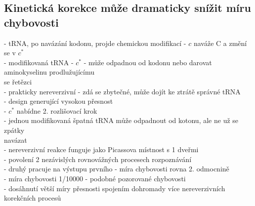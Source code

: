 \documentclass[11pt,a4paper]{report}
\begin{document}
\subsection{Kinetická korekce může dramaticky snížit míru chybovosti}
- tRNA, po navázání kodonu, projde chemickou modifikací - $c$ naváže C a změní se v $c^*$\\
\indent - modifikovaná tRNA - $c^*$ - může odpadnou od kodonu nebo darovat aminokyselinu prodlužujícímu\\
\indent \indent se řetězci\\
\indent - prakticky nereverzivní - zdá se zbytečné, může dojít ke ztrátě správné tRNA\\
\indent - design generující vysokou přesnost\\
\indent - $c^*$ nabídne 2. rozlišovací krok\\
\indent \indent - jednou modifikovaná špatná tRNA může odpadnout od kotonu, ale ne už se zpátky\\
\indent \indent \indent navázat\\
\indent \indent \indent - nereverzivní reakce funguje jako Picassova místnost s 1 dveřmi\\
\indent - povolení 2 nezávislých rovnovážných procesech rozpoznávání\\
\indent \indent - druhý pracuje na výstupu prvního - míra chybovosti rovna 2. odmocnině\\
- míra chybovosti 1/10000 - podobné pozorované chybovosti\\
- dosáhnutí větší míry přesnosti spojením dohromady více nereverzivních korekčních procesů\\
\end{document}
